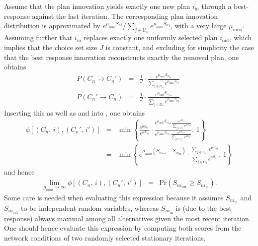 
Assume that the plan innovation yields exactly
one new plan $i_{\text{in}}$ through a best-response against the
last iteration. The corresponding plan innovation distribution is
approximated by $e^{\mu_{\text{inno}}S_{ni}}/\sum_{j\in \mathcal{U}_n}e^{\mu_{\text{inno}}S_{nj}}$,
with a very large $\mu_{\text{inno}}$. Assuming further that $i_{\text{in}}$
replaces exactly one uniformly selected plan $i_{\text{out}}$, 
which implies that the choice set size $J$ is constant, 
and excluding for simplicity the case that the best response innovation
reconstructs exactly the removed plan,
one obtains
\begin{eqnarray}
P(C_{n}\rightarrow C_{n}') & = & \frac{1}{J}\cdot\frac{e^{\mu_{\text{inno}}S_{ni_{\text{in}}}}}{\sum_{j\in \mathcal{U}_n}e^{\mu_{\text{inno}}S_{nj}}}\\
P(C_{n}'\rightarrow C_{n}) & = & \frac{1}{J}\cdot\frac{e^{\mu_{\text{inno}}S_{ni_{\text{out}}}}}{\sum_{j\in \mathcal{U}_n}e^{\mu_{\text{inno}}S_{nj}}}.
\end{eqnarray}
Inserting this as well as  and 
into , one obtains
\begin{eqnarray}
\phi[(C_{n},\, i),(C_{n}',\, i')] & = & 
\min\left\{ 
\frac{e^{\mu S_{ni'}}}{e^{\mu S_{ni}}}\cdot
\frac{{\displaystyle e^{\mu_{\text{inno}}S_{ni_{\text{out}}}}\frac{\displaystyle e^{\mu S_{ni}}}{\sum_{j\in C_{n}}\displaystyle e^{\mu S_{nj}}}}}
{{\displaystyle e^{\mu_{\text{inno}}S_{ni_{\text{in}}}}\frac{\displaystyle e^{\mu S_{ni'}}}{\sum_{j\in C_{n}'} \displaystyle e^{\mu S_{nj}}}}},\,1\right\} \\
 & = & 
 \min\left\{ 
 {\displaystyle e^{\mu_{\text{inno}}(S_{ni_{\text{out}}}-S_{ni_{\text{in}}})}} \cdot
 \frac{\sum_{j\in C_{n}'} \displaystyle e^{\mu S_{nj}}}{\sum_{j\in C_{n}} \displaystyle e^{\mu S_{nj}}},\,1\right\} 
\end{eqnarray}
and hence
\begin{eqnarray}
\lim_{\mu_{\text{inno}}\rightarrow\infty}
\phi[(C_{n},\, i),(C_{n}',\, i')] & = & \text{Pr}(S_{ni_{\text{out}}}\geq S_{ni_{\text{in}}}).
\end{eqnarray}
Some care is needed when evaluating this expression because it assumes
$S_{ni_{\text{in}}}$ and $S_{ni_{\text{out}}}$ to be independent
random variables, whereas $S_{ni_{\text{in}}}$ is (due to the best
response) always maximal among all alternatives given the most recent
iteration. One should hence evaluate this expression by computing
both scores from the network conditions of two randomly selected stationary
iterations.

